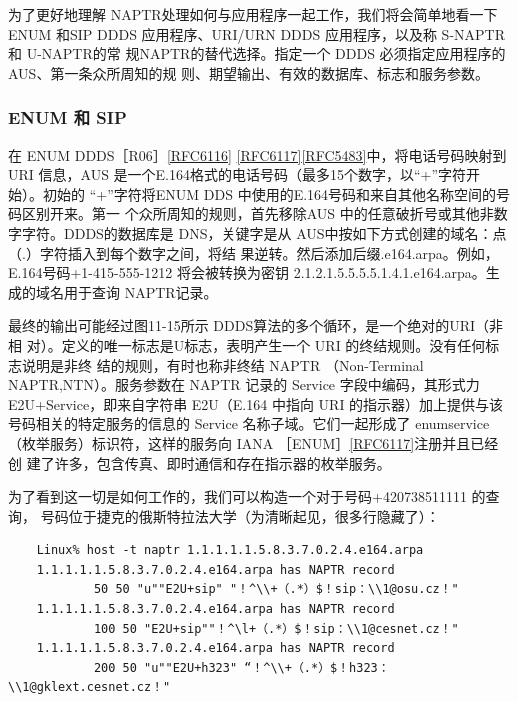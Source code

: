 为了更好地理解 NAPTR处理如何与应用程序一起工作，我们将会简单地看一下 ENUM
和SIP DDDS 应用程序、URI/URN DDDS 应用程序，以及称 S-NAPTR 和 U-NAPTR的常
规NAPTR的替代选择。指定一个 DDDS 必须指定应用程序的AUS、第一条众所周知的规
则、期望输出、有效的数据库、标志和服务参数。

\subsubsection{ENUM 和 SIP}

在 ENUM
DDDS［R06］\href{https://www.rfc-editor.org/rfc/rfc6116}{[RFC6116]}
\href{https://www.rfc-editor.org/rfc/rfc6117}{[RFC6117]}\href{https://www.rfc-editor.org/rfc/rfc5483}{[RFC5483]}中，将电话号码映射到URI
信息，AUS 是一个E.164格式的电话号码（最多15个数字，以“+”字符开始）。初始的
“+”字符将ENUM DDS 中使用的E.164号码和来自其他名称空间的号码区别开来。第一
个众所周知的规则，首先移除AUS 中的任意破折号或其他非数字字符。DDDS的数据库是
DNS，关键字是从 AUS中按如下方式创建的域名：点（.）字符插入到每个数字之间，将结
果逆转。然后添加后缀.e164.arpa。例如，E.164号码+1-415-555-1212 将会被转换为密钥
2.1.2.1.5.5.5.5.1.4.1.e164.arpa。生成的域名用于查询 NAPTR记录。

最终的输出可能经过图11-15所示 DDDS算法的多个循环，是一个绝对的URI（非相
对）。定义的唯一标志是U标志，表明产生一个 URI 的终结规则。没有任何标志说明是非终
结的规则，有时也称非终结 NAPTR （Non-Terminal NAPTR,NTN）。服务参数在 NAPTR
记录的 Service 字段中编码，其形式力 E2U+Service，即来自字符串 E2U（E.164 中指向 URI
的指示器）加上提供与该号码相关的特定服务的信息的 Service 名称子域。它们一起形成了
enumservice（枚举服务）标识符，这样的服务向 IANA
［ENUM］\href{https://www.rfc-editor.org/rfc/rfc6117}{[RFC6117]}注册并且已经创
建了许多，包含传真、即时通信和存在指示器的枚举服务。

为了看到这一切是如何工作的，我们可以构造一个对于号码+420738511111 的查询，
号码位于捷克的俄斯特拉法大学（为清晰起见，很多行隐藏了）：

\begin{verbatim}
    Linux% host -t naptr 1.1.1.1.1.5.8.3.7.0.2.4.e164.arpa
    1.1.1.1.1.5.8.3.7.0.2.4.e164.arpa has NAPTR record
            50 50 "u""E2U+sip" "！^\\+（.*）$！sip：\\1@osu.cz！"
    1.1.1.1.1.5.8.3.7.0.2.4.e164.arpa has NAPTR record
            100 50 "E2U+sip""！^\l+（.*）$！sip：\\1@cesnet.cz！"
    1.1.1.1.1.5.8.3.7.0.2.4.e164.arpa has NAPTR record
            200 50 "u""E2U+h323" “！^\\+（.*）$！h323：\\1@gklext.cesnet.cz！"
\end{verbatim}

